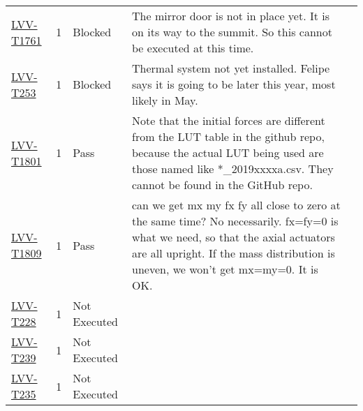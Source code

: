 \documentclass[SE,lsstdraft,STR,toc]{lsstdoc}
\begin{document}
{\begin{longtable}{p{2cm}cp{2.3cm}p{8.6cm}p{2.3cm}}
\begin{minipage}[]{9cm}
\medskip
\end{minipage}
&
\\\hline
\href{https://jira.lsstcorp.org/secure/Tests.jspa#/testCase/LVV-T1761}{LVV-T1761}
&  1
& Blocked &
\begin{minipage}[]{9cm}
\smallskip
The mirror door is not in place yet. It is on its way to the summit. So
this cannot be executed at this time.
\medskip
\end{minipage}
&
\\\hline
\href{https://jira.lsstcorp.org/secure/Tests.jspa#/testCase/LVV-T253}{LVV-T253}
&  1
& Blocked &
\begin{minipage}[]{9cm}
\smallskip
Thermal system not yet installed. Felipe says it is going to be later
this year, most likely in May.
\medskip
\end{minipage}
&
\\\hline
\href{https://jira.lsstcorp.org/secure/Tests.jspa#/testCase/LVV-T1801}{LVV-T1801}
&  1
& Pass &
\begin{minipage}[]{9cm}
\smallskip
Note that the initial forces are different from the LUT table in the
github repo, because the actual LUT being used are those named like
*\_2019xxxxa.csv. They cannot be found in the GitHub repo.
\medskip
\end{minipage}
&
\\\hline
\href{https://jira.lsstcorp.org/secure/Tests.jspa#/testCase/LVV-T1809}{LVV-T1809}
&  1
& Pass &
\begin{minipage}[]{9cm}
\smallskip
can we get mx my fx fy all close to zero at the same time? No
necessarily. fx=fy=0 is what we need, so that the axial actuators are
all upright. If the mass distribution is uneven, we won't get mx=my=0.
It is OK.
\medskip
\end{minipage}
&
\\\hline
\href{https://jira.lsstcorp.org/secure/Tests.jspa#/testCase/LVV-T228}{LVV-T228}
&  1
& Not Executed &
\begin{minipage}[]{9cm}
\smallskip

\medskip
\end{minipage}
&
\\\hline
\href{https://jira.lsstcorp.org/secure/Tests.jspa#/testCase/LVV-T239}{LVV-T239}
&  1
& Not Executed &
\begin{minipage}[]{9cm}
\smallskip

\medskip
\end{minipage}
&
\\\hline
\href{https://jira.lsstcorp.org/secure/Tests.jspa#/testCase/LVV-T235}{LVV-T235}
&  1
& Not Executed &
\begin{minipage}[]{9cm}
\smallskip


\end{minipage}
\end{longtable}}
\end{document}
